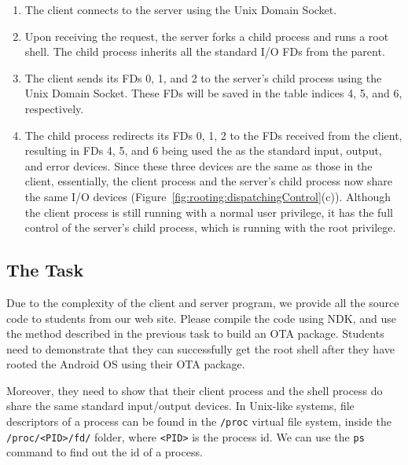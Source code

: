 \begin{enumerate}
  \item The client connects to the server using the Unix Domain Socket.

  \item Upon receiving the request, the server forks a child process and
	  runs a root shell. The child process inherits 
	  all the standard I/O FDs from the parent.

  \item The client sends its FDs 0, 1, and 2 to the server's child process using the Unix
	  Domain Socket. These FDs will be saved in 
	  the table indices 4, 5, and 6, respectively. 

  \item The child process redirects its FDs 0, 1, 2 to the FDs received
	  from the client, resulting in FDs 4, 5, and 6 being used 
	  the as the standard input, output, and error devices. Since these
	  three devices are the same as those in the client, essentially,
	  the client process and the server's child process now share the
	  same I/O devices
	  (Figure~\ref{fig:rooting:dispatchingControl}(c)). Although the
	  client process is still running with a normal user privilege, it
	  has the full control of the server's child process, which is
	  running with the root privilege.
	  
\end{enumerate}



\subsection{The Task}

Due to the complexity of the client and server program, we provide all the source code to
students from our web site. Please compile the code using NDK, and
use the method described in the previous task to build an OTA package. Students need to
demonstrate that they can successfully get the root shell after they have rooted the Android
OS using their OTA package. 


Moreover, they need to show that their client process and the shell process do share the same
standard input/output devices.  In Unix-like systems, file descriptors of a process can be found
in the \texttt{/proc} virtual file system, inside the \texttt{/proc/<PID>/fd/} folder, 
where \texttt{<PID>} is the process id. We can use the \texttt{ps} command to find out the
id of a process. 



